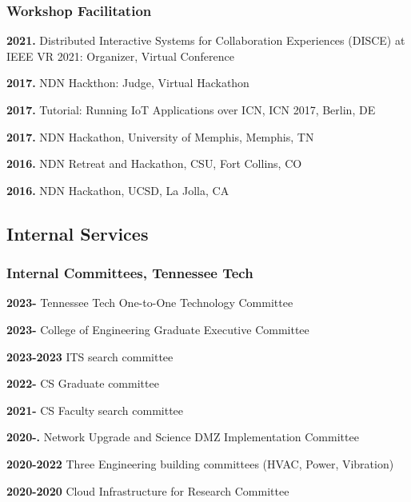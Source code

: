\subsubsection{Workshop Facilitation}
\begin{cvlist}
\item \textbf{2021.} Distributed Interactive Systems for Collaboration Experiences (DISCE) at IEEE VR 2021: Organizer, Virtual Conference
\item \textbf{2017.} NDN Hackthon: Judge, Virtual Hackathon
\item \textbf{2017.} Tutorial: Running IoT Applications over ICN, ICN 2017,  Berlin, DE
\item \textbf{2017.} NDN Hackathon, University of Memphis, Memphis, TN
\item \textbf{2016.} NDN Retreat and Hackathon, CSU, Fort Collins, CO
\item \textbf{2016.} NDN Hackathon, UCSD, La Jolla, CA
\end{cvlist}


\subsection{Internal Services}
\subsubsection{Internal Committees, Tennessee Tech}
\begin{cvlist}
\item \textbf{2023- } Tennessee Tech One-to-One Technology Committee
\item \textbf{2023- } College of Engineering Graduate Executive Committee
\item \textbf{2023-2023} ITS  search committee 
\item \textbf{2022- } CS  Graduate committee
\item \textbf{2021-} CS Faculty search committee 
\item \textbf{2020-.} Network Upgrade and Science DMZ Implementation Committee
\item \textbf{2020-2022} Three Engineering building committees (HVAC, Power, Vibration)
\item \textbf{2020-2020} Cloud Infrastructure for Research Committee
\end{cvlist}
